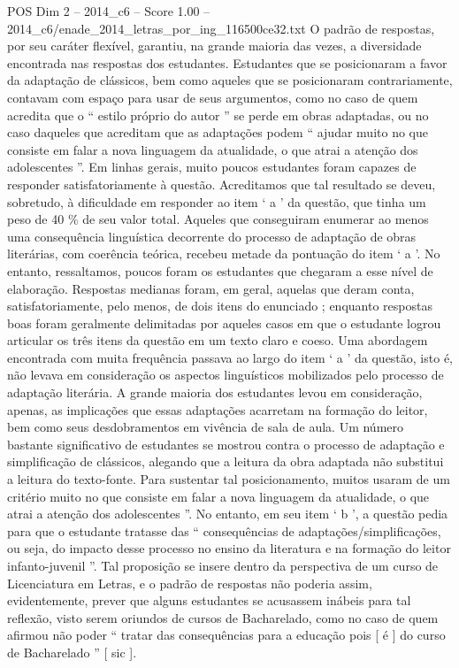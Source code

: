 \begin{textsample}{POS Dim 2 – 2014\_c6 – Score 1.00 – 2014\_c6/enade\_2014\_letras\_por\_ing\_116500ce32.txt}
O padrão de respostas, por seu caráter flexível, garantiu, na grande maioria das vezes, a diversidade encontrada nas respostas dos estudantes.
Estudantes que se posicionaram a favor da adaptação de clássicos, bem como aqueles que se posicionaram contrariamente, contavam com espaço para usar de seus argumentos, como no caso de quem acredita que o “ estilo próprio do autor ” se perde em obras adaptadas, ou no caso daqueles que acreditam que as adaptações podem “ ajudar muito no que consiste em falar a nova linguagem da atualidade, o que atrai a atenção dos adolescentes ”.
Em linhas gerais, muito poucos estudantes foram capazes de responder satisfatoriamente à questão.
Acreditamos que tal resultado se deveu, sobretudo, à dificuldade em responder ao item ‘ a ’ da questão, que tinha um peso de 40 \% de seu valor total.
Aqueles que conseguiram enumerar ao menos uma consequência linguística decorrente do processo de adaptação de obras literárias, com coerência teórica, recebeu metade da pontuação do item ‘ a ’.
No entanto, ressaltamos, poucos foram os estudantes que chegaram a esse nível de elaboração.
Respostas medianas foram, em geral, aquelas que deram conta, satisfatoriamente, pelo menos, de dois itens do enunciado ; enquanto respostas boas foram geralmente delimitadas por aqueles casos em que o estudante logrou articular os três itens da questão em um texto claro e coeso.
Uma abordagem encontrada com muita frequência passava ao largo do item ‘ a ’ da questão, isto é, não levava em consideração os aspectos linguísticos mobilizados pelo processo de adaptação literária.
A grande maioria dos estudantes levou em consideração, apenas, as implicações que essas adaptações acarretam na formação do leitor, bem como seus desdobramentos em vivência de sala de aula.
Um número bastante significativo de estudantes se mostrou contra o processo de adaptação e simplificação de clássicos, alegando que a leitura da obra adaptada não substitui a leitura do texto-fonte.
Para sustentar tal posicionamento, muitos usaram de um critério muito no que consiste em falar a nova linguagem da atualidade, o que atrai a atenção dos adolescentes ”.
No entanto, em seu item ‘ b ’, a questão pedia para que o estudante tratasse das “ consequências de adaptações/simplificações, ou seja, do impacto desse processo no ensino da literatura e na formação do leitor infanto-juvenil ”.
Tal proposição se insere dentro da perspectiva de um curso de Licenciatura em Letras, e o padrão de respostas não poderia assim, evidentemente, prever que alguns estudantes se acusassem inábeis para tal reflexão, visto serem oriundos de cursos de Bacharelado, como no caso de quem afirmou não poder “ tratar das consequências para a educação pois [ é ] do curso de Bacharelado ” [ sic ].

\end{textsample}
